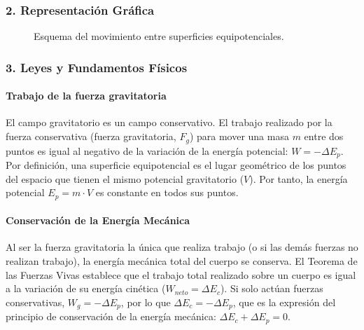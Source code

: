 \subsubsection*{2. Representación Gráfica}
\begin{figure}[H]
    \centering
    \caption{Esquema del movimiento entre superficies equipotenciales.}
\end{figure}

\subsubsection*{3. Leyes y Fundamentos Físicos}
\paragraph*{Trabajo de la fuerza gravitatoria} El campo gravitatorio es un campo conservativo. El trabajo realizado por la fuerza conservativa (fuerza gravitatoria, $F_g$) para mover una masa $m$ entre dos puntos es igual al negativo de la variación de la energía potencial: $W = -\Delta E_p$. Por definición, una superficie equipotencial es el lugar geométrico de los puntos del espacio que tienen el mismo potencial gravitatorio ($V$). Por tanto, la energía potencial $E_p = m \cdot V$ es constante en todos sus puntos.

\paragraph*{Conservación de la Energía Mecánica} Al ser la fuerza gravitatoria la única que realiza trabajo (o si las demás fuerzas no realizan trabajo), la energía mecánica total del cuerpo se conserva. El Teorema de las Fuerzas Vivas establece que el trabajo total realizado sobre un cuerpo es igual a la variación de su energía cinética ($W_{neto} = \Delta E_c$). Si solo actúan fuerzas conservativas, $W_{g} = -\Delta E_p$, por lo que $\Delta E_c = -\Delta E_p$, que es la expresión del principio de conservación de la energía mecánica: $\Delta E_c + \Delta E_p = 0$.

